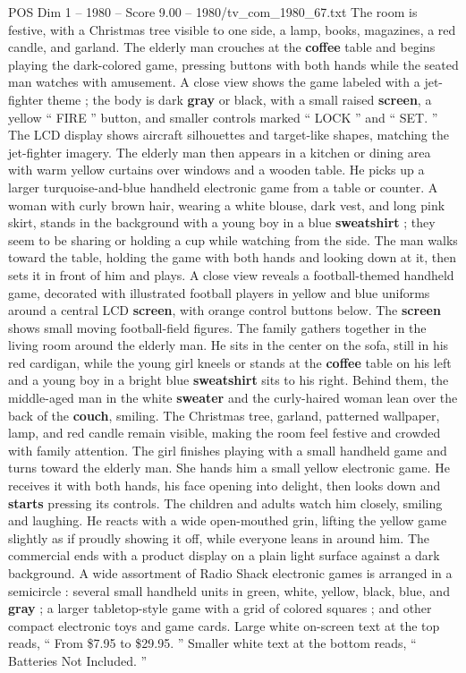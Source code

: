 \begin{textsample}{POS Dim 1 – 1980 – Score 9.00 – 1980/tv\_com\_1980\_67.txt}
The room is festive, with a Christmas tree visible to one side, a lamp, books, magazines, a red candle, and garland.
The elderly man crouches at the \textbf{coffee} table and begins playing the dark-colored game, pressing buttons with both hands while the seated man watches with amusement.
A close view shows the game labeled with a jet-fighter theme ; the body is dark \textbf{gray} or black, with a small raised \textbf{screen}, a yellow “ FIRE ” button, and smaller controls marked “ LOCK ” and “ SET. ” The LCD display shows aircraft silhouettes and target-like shapes, matching the jet-fighter imagery.
The elderly man then appears in a kitchen or dining area with warm yellow curtains over windows and a wooden table.
He picks up a larger turquoise-and-blue handheld electronic game from a table or counter.
A woman with curly brown hair, wearing a white blouse, dark vest, and long pink skirt, stands in the background with a young boy in a blue \textbf{sweatshirt} ; they seem to be sharing or holding a cup while watching from the side.
The man walks toward the table, holding the game with both hands and looking down at it, then sets it in front of him and plays.
A close view reveals a football-themed handheld game, decorated with illustrated football players in yellow and blue uniforms around a central LCD \textbf{screen}, with orange control buttons below.
The \textbf{screen} shows small moving football-field figures.
The family gathers together in the living room around the elderly man.
He sits in the center on the sofa, still in his red cardigan, while the young girl kneels or stands at the \textbf{coffee} table on his left and a young boy in a bright blue \textbf{sweatshirt} sits to his right.
Behind them, the middle-aged man in the white \textbf{sweater} and the curly-haired woman lean over the back of the \textbf{couch}, smiling.
The Christmas tree, garland, patterned wallpaper, lamp, and red candle remain visible, making the room feel festive and crowded with family attention.
The girl finishes playing with a small handheld game and turns toward the elderly man.
She hands him a small yellow electronic game.
He receives it with both hands, his face opening into delight, then looks down and \textbf{starts} pressing its controls.
The children and adults watch him closely, smiling and laughing.
He reacts with a wide open-mouthed grin, lifting the yellow game slightly as if proudly showing it off, while everyone leans in around him.
The commercial ends with a product display on a plain light surface against a dark background.
A wide assortment of Radio Shack electronic games is arranged in a semicircle : several small handheld units in green, white, yellow, black, blue, and \textbf{gray} ; a larger tabletop-style game with a grid of colored squares ; and other compact electronic toys and game cards.
Large white on-screen text at the top reads, “ From \$7.95 to \$29.95. ” Smaller white text at the bottom reads, “ Batteries Not Included. ”

\end{textsample}
